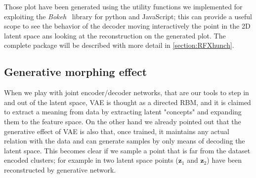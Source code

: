 Those plot have been generated using the utility functions we implemented for \RFXhunch exploiting the \textit{Bokeh}~\cite{bokeh} library for python and JavaScript; this can provide a useful scope to see the behavior of the decoder moving interactively the point in the 2D latent space ans looking at the reconstruction on the generated plot.
The complete \RFXhunch package will be described with more detail in \cref{section:RFXhunch}.
%
\subsection{Generative morphing effect}
When we play with joint encoder/decoder networks, that are our tools to step in and out of the latent space, \acs{VAE} is thought as a directed \acs{RBM}, and it is claimed to extract a meaning from data by extracting latent "concepts" and expanding them to the feature space. On the other hand we already pointed out that the generative effect of \acs{VAE} is also that, once trained, it maintains any actual relation with the data and can generate samples by only means of decoding the latent space. This becomes clear if we sample a point that is far from the dataset encoded clusters; for example in \Figure{\ref{fig:step1_morph}} two latent space points ($\bm{z}_1$ and $\bm{z}_2$) have been reconstructed by generative network. 
%
